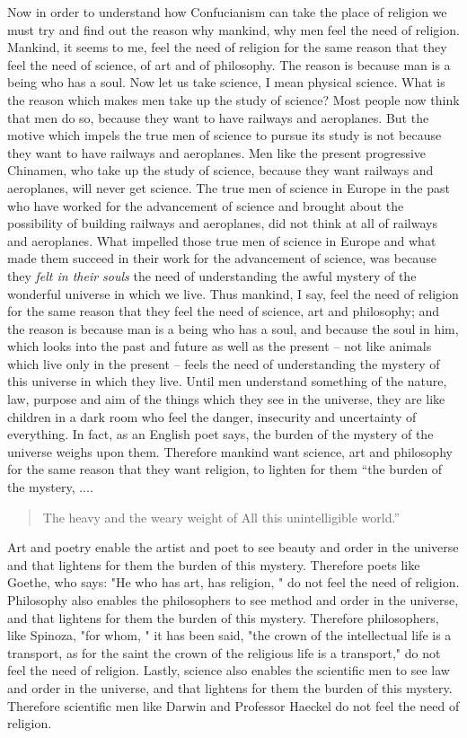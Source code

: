 Now in order to understand how Confucianism can take the place of religion we must try and find out the reason why mankind, why men feel the need of religion. Mankind, it seems to me, feel the need of religion for the same reason that they feel the need of science, of art and of philosophy. The reason is because man is a being who has a soul. Now let us take science, I mean physical science. What is the reason which makes men take up the study of science? Most people now think that men do so, because they want to have railways and aeroplanes. But the motive which impels the true men of science to pursue its study is not because they want to have railways and aeroplanes. Men like the present progressive Chinamen, who take up the study of science, because they want railways and aeroplanes, will never get science. The true men of science in Europe in the past who have worked for the advancement of science and brought about the possibility of building railways and aeroplanes, did not think at all of railways and aeroplanes. What impelled those true men of science in Europe and what made them succeed in their work for the advancement of science, was because they \emph{felt in their souls} the need of understanding the awful mystery of the wonderful universe in which we live. Thus mankind, I say, feel the need of religion for the same reason that they feel the need of science, art and philosophy; and the reason is because man is a being who has a soul, and because the soul in him, which looks into the past and future as well as the present --  not like animals which live only in the present -- feels the need of understanding the mystery of this universe in which they live. Until men understand something of the nature, law, purpose and aim of the things which they see in the universe, they are like children in a dark room who feel the danger, insecurity and uncertainty of everything. In fact, as an English poet says, the burden of the mystery of the universe weighs upon them. Therefore mankind want science, art and philosophy for the same reason that they want religion, to lighten for them ``the burden of the mystery, ....
\begin{quote}
The heavy and the weary weight of All this unintelligible world.''
\end{quote}

Art and poetry enable the artist and poet to see beauty and order in the universe and that lightens for them the burden of this mystery. Therefore poets like Goethe, who says: "He who has art, has religion, " do not feel the need of religion. Philosophy also enables the philosophers to see method and order in the universe, and that lightens for them the burden of this mystery. Therefore philosophers, like Spinoza, "for whom, " it has been said, "the crown of the intellectual life is a transport, as for the saint the crown of the religious life is a transport," do not feel the need of religion. Lastly, science also enables the scientific men to see law and order in the universe, and that lightens for them the burden of this mystery. Therefore scientific men like Darwin and Professor Haeckel do not feel the need of religion.

